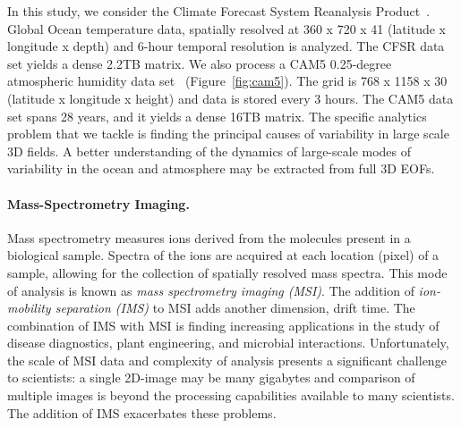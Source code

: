 In this study, we consider the Climate Forecast System Reanalysis Product~\cite{saha:2010}. Global Ocean temperature data, spatially resolved at 360 x 720 x 41 (latitude x longitude x depth) and 6-hour temporal resolution is analyzed. The CFSR data set yields a dense 2.2TB matrix. We also process a CAM5 0.25-degree atmospheric humidity data set~\cite{wehner:2014} (Figure~\ref{fig:cam5}). The grid is 768 x 1158 x 30 (latitude x longitude x height) and data is stored every 3 hours. The CAM5 data set spans 28 years, and it yields a dense 16TB matrix. The specific analytics problem that we tackle is finding the principal causes of variability in large scale 3D fields. A better understanding of the dynamics of large-scale modes of variability in the ocean and atmosphere may be extracted from full 3D EOFs.

\paragraph{Mass-Spectrometry Imaging.}
Mass spectrometry measures ions derived from the molecules present in a biological sample. Spectra of the ions are acquired at each location (pixel) of a sample, allowing for the collection of spatially resolved mass spectra. This mode of analysis is known as \textit{mass spectrometry imaging (MSI)}. The addition of \textit{ion-mobility separation (IMS)} to MSI adds another dimension, drift time.  The combination of IMS with MSI is finding increasing applications in the study of disease diagnostics, plant engineering, and microbial interactions. Unfortunately, the scale of MSI data and complexity of analysis presents a significant challenge to scientists: a single 2D-image may be many gigabytes and comparison of multiple images is beyond the processing capabilities available to many scientists. The addition of IMS exacerbates these problems. 


